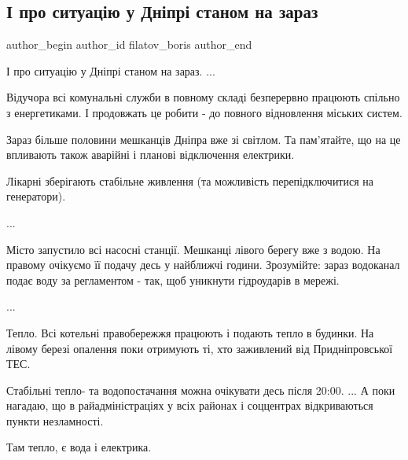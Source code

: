  
 
 
 
 
 
\subsection{І про ситуацію у Дніпрі станом на зараз}
\label{sec:24_11_2022.fb.filatov_boris.1.situacia_dnepr}
 
\ifcmt
 author_begin
   author_id filatov_boris
 author_end
\fi

І про ситуацію у Дніпрі станом на зараз. 
...

Відучора всі комунальні служби в повному складі безперервно працюють спільно з
енергетиками. І продовжать це робити - до повного відновлення міських систем. 

Зараз більше половини мешканців Дніпра вже зі світлом. Та пам’ятайте, що на це
впливають також аварійні і планові відключення електрики. 

Лікарні зберігають стабільне живлення (та можливість перепідключитися на
генератори).

...

Місто запустило всі насосні станції. Мешканці лівого берегу вже з водою. На
правому очікуємо її подачу десь у найближчі години. Зрозумійте: зараз водоканал
подає воду за регламентом - так, щоб уникнути гідроударів в мережі.

...

Тепло. Всі котельні правобережжя працюють і подають тепло в будинки. На лівому
березі опалення поки отримують ті, хто заживлений від Придніпровської ТЕС. 

Стабільні тепло- та водопостачання можна очікувати десь після 20:00.  ...  А
поки нагадаю, що в райадміністраціях у всіх районах і соццентрах відкриваються
пункти незламності. 

Там тепло, є вода і електрика.

